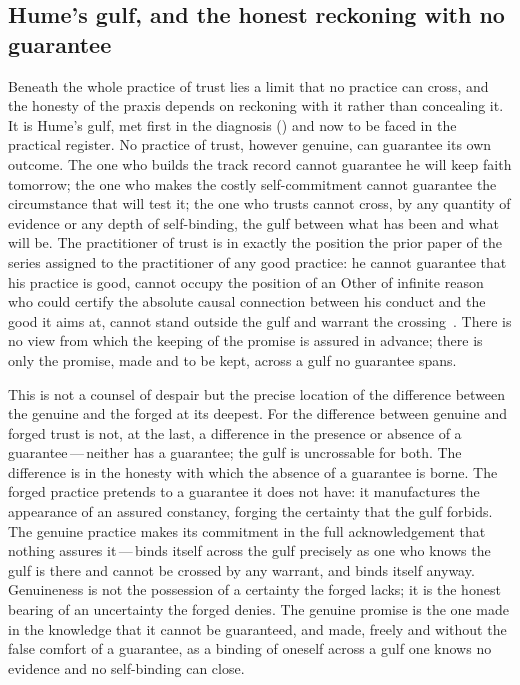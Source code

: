 \subsection{Hume's gulf, and the honest reckoning with no guarantee}
\label{p13:sub:prax-hume}

Beneath the whole practice of trust lies a limit that no practice can cross, and the honesty of the praxis depends on reckoning with it rather than concealing it. It is Hume's gulf, met first in the diagnosis () and now to be faced in the practical register. No practice of trust, however genuine, can guarantee its own outcome. The one who builds the track record cannot guarantee he will keep faith tomorrow; the one who makes the costly self-commitment cannot guarantee the circumstance that will test it; the one who trusts cannot cross, by any quantity of evidence or any depth of self-binding, the gulf between what has been and what will be. The practitioner of trust is in exactly the position the prior paper of the series assigned to the practitioner of any good practice: he cannot guarantee that his practice is good, cannot occupy the position of an Other of infinite reason who could certify the absolute causal connection between his conduct and the good it aims at, cannot stand outside the gulf and warrant the crossing~\parencite{wanhong_grb,hume2000}. There is no view from which the keeping of the promise is assured in advance; there is only the promise, made and to be kept, across a gulf no guarantee spans.

This is not a counsel of despair but the precise location of the difference between the genuine and the forged at its deepest. For the difference between genuine and forged trust is not, at the last, a difference in the presence or absence of a guarantee\,---\,neither has a guarantee; the gulf is uncrossable for both. The difference is in the honesty with which the absence of a guarantee is borne. The forged practice pretends to a guarantee it does not have: it manufactures the appearance of an assured constancy, forging the certainty that the gulf forbids. The genuine practice makes its commitment in the full acknowledgement that nothing assures it\,---\,binds itself across the gulf precisely as one who knows the gulf is there and cannot be crossed by any warrant, and binds itself anyway. Genuineness is not the possession of a certainty the forged lacks; it is the honest bearing of an uncertainty the forged denies. The genuine promise is the one made in the knowledge that it cannot be guaranteed, and made, freely and without the false comfort of a guarantee, as a binding of oneself across a gulf one knows no evidence and no self-binding can close.

